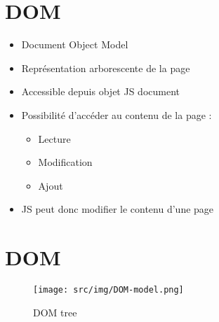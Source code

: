 \hypertarget{dom}{%
\section{DOM}\label{dom}}

\begin{itemize}
\tightlist
\item
  Document Object Model
\item
  Représentation arborescente de la page
\item
  Accessible depuis objet JS document
\item
  Possibilité d'accéder au contenu de la page :

  \begin{itemize}
  \tightlist
  \item
    Lecture
  \item
    Modification
  \item
    Ajout
  \end{itemize}
\item
  JS peut donc modifier le contenu d'une page
\end{itemize}

\hypertarget{dom-1}{%
\section{DOM}\label{dom-1}}

\begin{otherlanguage}{english}

\begin{Shaded}
\begin{Highlighting}[]
    \KeywordTok{>}
\end{Highlighting}
\end{Shaded}

\end{otherlanguage}

\begin{figure}
\centering
\texttt{[image: src/img/DOM-model.png]}
\caption{DOM tree}
\end{figure}

\begin{otherlanguage}{english}

\end{otherlanguage}


